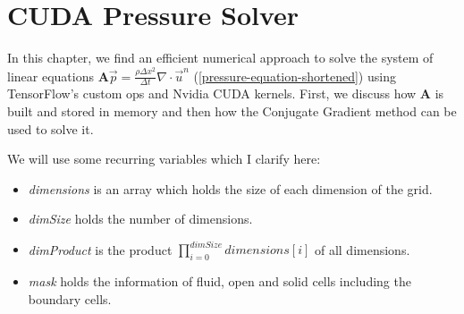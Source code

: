 \chapter{CUDA Pressure Solver}\label{chapter:cudapressuresolver}
In this chapter, we find an efficient numerical approach to solve the system of linear equations $\mathbf{A}\vec{p} = \frac{\rho \Delta x^2}{\Delta t}\nabla \cdot \vec{u}^n$ (\ref{pressure-equation-shortened}) using TensorFlow's custom ops and Nvidia CUDA kernels. First, we discuss how \textbf{A} is built and stored in memory and then how the Conjugate Gradient method can be used to solve it. 
\par We will use some recurring variables which I clarify here:
\begin{itemize}
	\setlength\itemsep{-0.3em}
	\item \textit{dimensions} is an array which holds the size of each dimension of the grid.
	\item \textit{dimSize} holds the number of dimensions.
	\item \textit{dimProduct} is the product $\prod_{i=0}^{dimSize} \textit{dimensions}[i]$ of all dimensions. 
	\item \textit{mask} holds the information of fluid, open and solid cells including the boundary cells.
\end{itemize}

